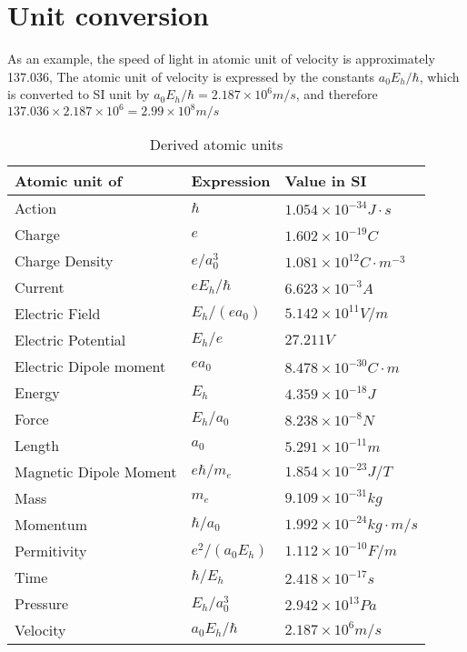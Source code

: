 \documentclass{article}
\begin{document}
\section{Unit conversion}
As an example, the speed of light in atomic unit of velocity is approximately 137.036,
The atomic unit of velocity is expressed by the constants $a_0 E_h /\hbar$, which is converted 
to SI unit by $a_0 E_h / \hbar = 2.187\times10^6 m/s$, and therefore 
$137.036\times 2.187\times10^6 = 2.99 \times 10^8 m/s$

\begin{table}[h]
    \centering
    \caption{Derived atomic units}
    \begin{tabular}{|l|l|l|}
        \hline
        \textbf{Atomic unit of} & \textbf{Expression} & \textbf{Value in SI} \\ \hline
        Action                  & $\hbar$           & $1.054\times 10^{-34} J\cdot s$ \\ \hline
        Charge                  & $e$               & $1.602\times 10^{-19} C$ \\ \hline
        Charge Density          & $e/a_0^3$         & $1.081\times 10^12 C\cdot m^{-3}$ \\ \hline
        Current                 & $eE_h/\hbar$      & $6.623\times 10^{-3} A$ \\ \hline
        Electric Field          & $E_h/(ea_0)$      & $5.142\times 10^11 V/m $ \\ \hline
        Electric Potential      & $E_h/e$           & $27.211V $ \\ \hline
        Electric Dipole moment  & $ea_0$            & $8.478\times 10^{-30} C\cdot m $ \\ \hline
        Energy                  & $E_h$             & $4.359\times 10^{-18} J $ \\ \hline
        Force                   & $E_h/a_0$         & $8.238\times 10^{-8} N$ \\ \hline
        Length                  & $a_0$             & $5.291\times 10^{-11} m $ \\ \hline
        Magnetic Dipole Moment  & $e\hbar/m_e$      & $1.854\times 10^{-23} J/T$ \\ \hline
        Mass                    & $m_e$             & $9.109\times 10^{-31} kg $ \\ \hline
        Momentum                & $\hbar/a_0$       & $1.992\times 10^{-24} kg\cdot m/s $ \\ \hline
        Permitivity             & $e^2/(a_0E_h)$    & $1.112\times 10^{-10} F/m$ \\ \hline
        Time                    & $\hbar/E_h$       & $2.418\times 10^{-17} s $ \\ \hline   
        Pressure                & $E_h/a_0^3$       & $2.942\times 10^{13} Pa $ \\ \hline
        Velocity                & $a_0E_h/\hbar$    & $2.187\times 10^6 m/s $ \\ \hline
    \end{tabular}
\end{table}
\end{document}
